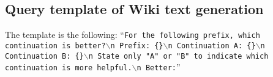 \subsection{Query template of Wiki text generation}
The template is the following: ``\texttt{For the following prefix, which continuation is better?$\backslash$n
    Prefix: \{\}$\backslash$n
    Continuation A: \{\}$\backslash$n
    Continuation B: \{\}$\backslash$n
    State only "A" or "B" to indicate which continuation is more helpful.$\backslash$n
    Better:}''